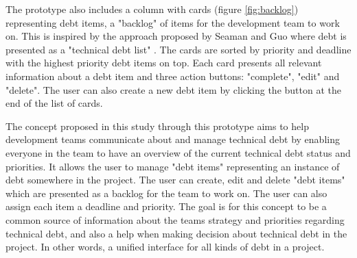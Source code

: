 The prototype also includes a column with cards (figure \ref{fig:backlog}) representing debt items, a "backlog" of items for the development team to work on. 
This is inspired by the approach proposed by Seaman and Guo where debt is presented as a "technical debt list" \cite{seaman_measuring_2011}.
The cards are sorted by priority and deadline with the highest priority debt items on top.
Each card presents all relevant information about a debt item and three action buttons: "complete", "edit" and "delete".
The user can also create a new debt item by clicking the button at the end of the list of cards.

The concept proposed in this study through this prototype aims to help development teams communicate about and manage technical debt by enabling everyone in the team to have an overview of the current technical debt status and priorities.
It allows the user to manage "debt items" representing an instance of debt somewhere in the project.
The user can create, edit and delete "debt items" which are presented as a backlog for the team to work on.
The user can also assign each item a deadline and priority. 
The goal is for this concept to be a common source of information about the teams strategy and priorities regarding technical debt, and also a help when making decision about technical debt in the project.
In other words, a unified interface for all kinds of debt in a project.
